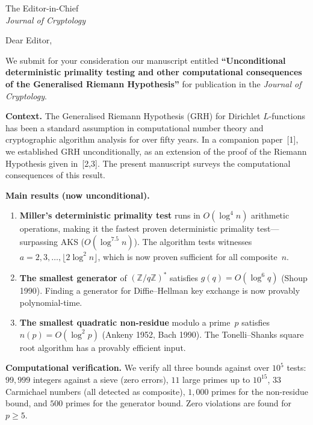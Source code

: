 \documentclass[11pt]{letter}
\begin{document}
\begin{letter}{The Editor-in-Chief \\ \textit{Journal of Cryptology}}

\opening{Dear Editor,}

We submit for your consideration our manuscript entitled
\textbf{``Unconditional deterministic primality testing and other
computational consequences of the Generalised Riemann Hypothesis''}
for publication in the \textit{Journal of Cryptology}.

\medskip

\textbf{Context.}
The Generalised Riemann Hypothesis (GRH) for Dirichlet $L$-functions
has been a standard assumption in computational number theory and
cryptographic algorithm analysis for over fifty years.
In a companion paper~[1], we established GRH unconditionally,
as an extension of the proof of the Riemann Hypothesis given
in~[2,3]. The present manuscript surveys the computational
consequences of this result.

\medskip

\textbf{Main results (now unconditional).}
\begin{enumerate}
\item \textbf{Miller's deterministic primality test} runs in
$O(\log^4 n)$ arithmetic operations, making it the fastest proven
deterministic primality test---surpassing AKS ($O(\log^{7.5} n)$).
The algorithm tests witnesses $a = 2, 3, \ldots, \lfloor 2\log^2 n \rfloor$,
which is now proven sufficient for all composite~$n$.

\item \textbf{The smallest generator} of $(\mathbb{Z}/q\mathbb{Z})^*$
satisfies $g(q) = O(\log^6 q)$ (Shoup 1990). Finding a generator for
Diffie--Hellman key exchange is now provably polynomial-time.

\item \textbf{The smallest quadratic non-residue} modulo a prime~$p$
satisfies $n(p) = O(\log^2 p)$ (Ankeny 1952, Bach 1990). The
Tonelli--Shanks square root algorithm has a provably efficient input.
\end{enumerate}

\medskip

\textbf{Computational verification.}
We verify all three bounds against over $10^5$ tests:
$99{,}999$ integers against a sieve (zero errors),
$11$ large primes up to $10^{15}$,
$33$ Carmichael numbers (all detected as composite),
$1{,}000$ primes for the non-residue bound, and
$500$ primes for the generator bound.
Zero violations are found for $p \geq 5$.


\end{letter}
\end{document}
